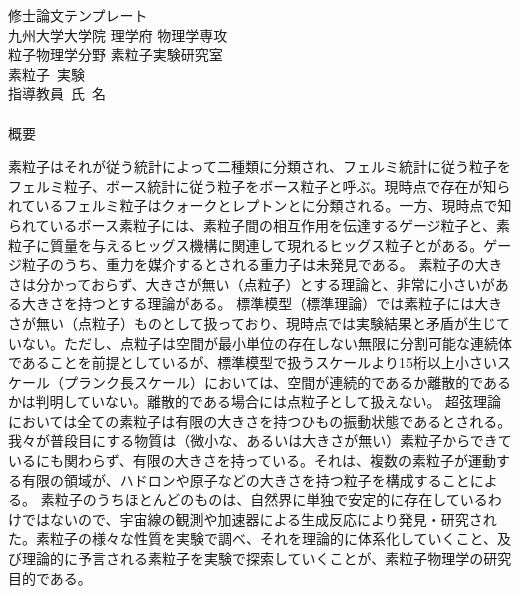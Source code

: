 
\begin{center}
\thispagestyle{empty}
{\Large 修士論文テンプレート}\\
九州大学大学院 理学府 物理学専攻 \\ 粒子物理学分野 素粒子実験研究室 \\
素粒子\ 実験 \\[1ex] 指導教員\ 氏\ 名\\ 　 \\
\fi
{\huge 概要}\\
\end{center}

素粒子はそれが従う統計によって二種類に分類され、フェルミ統計に従う粒子をフェルミ粒子、ボース統計に従う粒子をボース粒子と呼ぶ。現時点で存在が知られているフェルミ粒子はクォークとレプトンとに分類される。一方、現時点で知られているボース素粒子には、素粒子間の相互作用を伝達するゲージ粒子と、素粒子に質量を与えるヒッグス機構に関連して現れるヒッグス粒子とがある。ゲージ粒子のうち、重力を媒介するとされる重力子は未発見である。
素粒子の大きさは分かっておらず、大きさが無い（点粒子）とする理論と、非常に小さいがある大きさを持つとする理論がある。
標準模型（標準理論）では素粒子には大きさが無い（点粒子）ものとして扱っており、現時点では実験結果と矛盾が生じていない。ただし、点粒子は空間が最小単位の存在しない無限に分割可能な連続体であることを前提としているが、標準模型で扱うスケールより15桁以上小さいスケール（プランク長スケール）においては、空間が連続的であるか離散的であるかは判明していない。離散的である場合には点粒子として扱えない。
超弦理論においては全ての素粒子は有限の大きさを持つひもの振動状態であるとされる。
我々が普段目にする物質は（微小な、あるいは大きさが無い）素粒子からできているにも関わらず、有限の大きさを持っている。それは、複数の素粒子が運動する有限の領域が、ハドロンや原子などの大きさを持つ粒子を構成することによる。
素粒子のうちほとんどのものは、自然界に単独で安定的に存在しているわけではないので、宇宙線の観測や加速器による生成反応により発見・研究された。素粒子の様々な性質を実験で調べ、それを理論的に体系化していくこと、及び理論的に予言される素粒子を実験で探索していくことが、素粒子物理学の研究目的である。